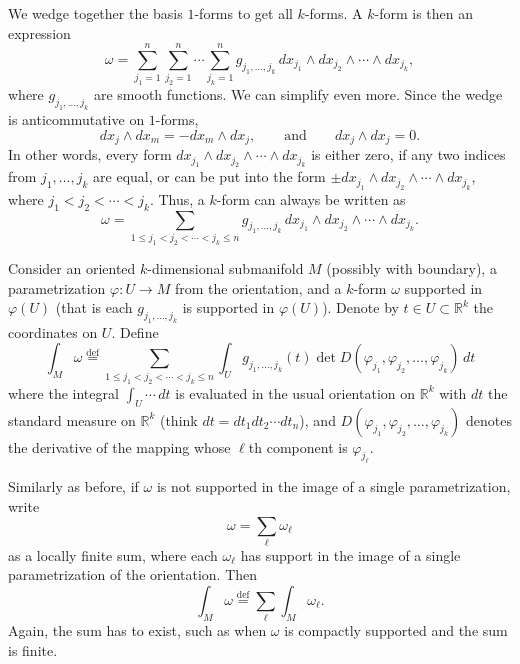 \documentclass[12pt,openany]{book}
\newcommand{\R}{{\mathbb{R}}}
\theoremstyle{plain}
\theoremstyle{remark}
\theoremstyle{definition}
\theoremstyle{exercise}
\theoremstyle{example}
\begin{document}
We wedge together the basis $1$-forms to
get all $k$-forms.
A $k$-form is then an expression
\begin{equation*}
\omega =
\sum_{j_1=1}^n
\sum_{j_2=1}^n
\cdots
\sum_{j_k=1}^n
g_{j_1,\ldots,j_k}
\,
dx_{j_1} \wedge
dx_{j_2} \wedge
\cdots \wedge
dx_{j_k}  ,
\end{equation*}
where $g_{j_1,\ldots,j_k}$ are smooth functions.
We can simplify even more.  Since the wedge
is anticommutative on $1$-forms,
\begin{equation*}
dx_j \wedge dx_m = 
-dx_m \wedge dx_j
,
\qquad
\text{and}
\qquad
dx_j \wedge dx_j = 0 .
\end{equation*}
In other words,
every form 
$dx_{j_1} \wedge
dx_{j_2} \wedge
\cdots \wedge
dx_{j_k}$ 
is either zero, if any two indices from $j_1,\ldots,j_k$ are equal, or
can be put into the form
$\pm dx_{j_1} \wedge
dx_{j_2} \wedge
\cdots \wedge
dx_{j_k}$, where $j_1 < j_2 < \cdots < j_k$.
Thus, a $k$-form can always be written as
\begin{equation*}
\omega =
\sum_{1 \leq j_1 < j_2 < \cdots < j_k \leq n}
g_{j_1,\ldots,j_k}
\,
dx_{j_1} \wedge
dx_{j_2} \wedge
\cdots \wedge
dx_{j_k}  .
\end{equation*}

Consider
an oriented $k$-dimensional submanifold $M$
(possibly with boundary), a parametrization $\varphi \colon U \to M$
from the orientation,
and a $k$-form $\omega$
supported in $\varphi(U)$ (that is each $g_{j_1,\ldots,j_k}$ is supported in
$\varphi(U)$).
Denote by $t \in U \subset \R^k$
the coordinates on $U$.  Define
\begin{equation*}
\int_M \omega
\overset{\text{def}}{=}
\sum_{1 \leq j_1 < j_2 < \cdots < j_k \leq n}
\int_U
g_{j_1,\ldots,j_k}(t)
\det D (\varphi_{j_1},\varphi_{j_2},\ldots,\varphi_{j_k})
\,
dt
\end{equation*}
where the integral $\int_U \cdots\, dt$ is evaluated in the
usual orientation on $\R^k$ with $dt$ the standard
measure on $\R^k$ (think $dt = dt_1 dt_2 \cdots dt_n$), and
$D (\varphi_{j_1},\varphi_{j_2},\ldots,\varphi_{j_k})$
denotes the derivative of the mapping whose $\ell$th component
is $\varphi_{j_\ell}$.

Similarly as before, if $\omega$ is not supported in the
image of a single parametrization, write
\begin{equation*}
\omega = \sum_{\ell} \omega_\ell 
\end{equation*}
as a locally finite sum,
where each $\omega_\ell$ has support in the image of a single
parametrization of the orientation.
Then
\begin{equation*}
\int_M \omega
\overset{\text{def}}{=}
\sum_{\ell}
\int_M \omega_\ell .
\end{equation*}
Again, the sum has to exist, such as when $\omega$ is compactly supported
and the sum is finite.
\end{document}
